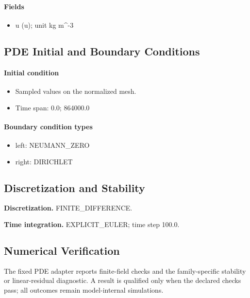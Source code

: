 \documentclass[11pt]{article}
\begin{document}
\paragraph{Fields}
\begin{itemize}\raggedright
\item u (u); unit kg m\textasciicircum{}-3
\end{itemize}

\subsection{PDE Initial and Boundary Conditions}

\paragraph{Initial condition}
\begin{itemize}\raggedright
\item Sampled values on the normalized mesh.
\item Time span: 0.0; 864000.0
\end{itemize}

\paragraph{Boundary condition types}
\begin{itemize}\raggedright
\item left: NEUMANN\_\allowbreak{}ZERO
\item right: DIRICHLET
\end{itemize}

\subsection{Discretization and Stability}

\noindent\textbf{Discretization.} FINITE\_DIFFERENCE.

\noindent\textbf{Time integration.} EXPLICIT\_EULER; time step 100.0.

\subsection{Numerical Verification}

\noindent The fixed PDE adapter reports finite-field checks and the family-specific stability or linear-residual diagnostic. A result is qualified only when the declared checks pass; all outcomes remain model-internal simulations.
\end{document}
